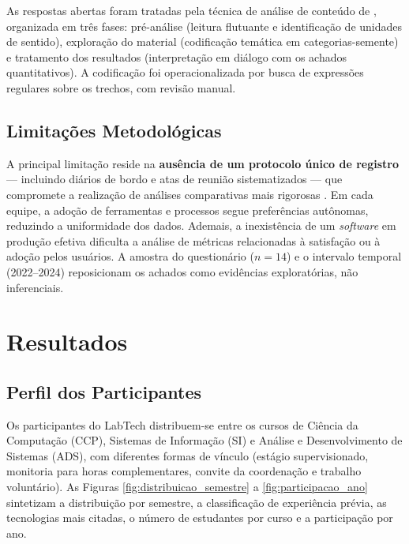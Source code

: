 \documentclass[12pt,a4paper]{article}
\begin{document}
As respostas abertas foram tratadas pela t\'ecnica de an\'alise de
conte\'udo de , organizada em tr\^es fases:
pr\'e-an\'alise (leitura flutuante e identifica\c{c}\~ao de unidades de
sentido), explora\c{c}\~ao do material (codifica\c{c}\~ao tem\'atica em
categorias-semente) e tratamento dos resultados (interpreta\c{c}\~ao em
di\'alogo com os achados quantitativos). A codifica\c{c}\~ao foi
operacionalizada por busca de express\~oes regulares sobre os trechos,
com revis\~ao manual.

\subsection{Limita\c{c}\~oes Metodol\'ogicas}
\label{sec:limitacoes}

A principal limita\c{c}\~ao reside na \textbf{aus\^encia de um protocolo
\'unico de registro} --- incluindo di\'arios de bordo e atas de reuni\~ao
sistematizados --- que compromete a realiza\c{c}\~ao de an\'alises
comparativas mais rigorosas \cite{mineiro2022pesquisa}. Em cada equipe,
a ado\c{c}\~ao de ferramentas e processos segue prefer\^encias aut\^onomas,
reduzindo a uniformidade dos dados. Ademais, a inexist\^encia de um
\emph{software} em produ\c{c}\~ao efetiva dificulta a an\'alise de
m\'etricas relacionadas \`a satisfa\c{c}\~ao ou \`a ado\c{c}\~ao pelos
usu\'arios. A amostra do question\'ario ($n=14$) e o intervalo
temporal (2022--2024) reposicionam os achados como evid\^encias
explorat\'orias, n\~ao inferenciais.

\section{Resultados}
\label{sec:resultados}

\subsection{Perfil dos Participantes}
\label{sec:perfil}

Os participantes do LabTech distribuem-se entre os cursos de Ci\^encia
da Computa\c{c}\~ao (CCP), Sistemas de Informa\c{c}\~ao (SI) e An\'alise e
Desenvolvimento de Sistemas (ADS), com diferentes formas de v\'inculo
(est\'agio supervisionado, monitoria para horas complementares, convite
da coordena\c{c}\~ao e trabalho volunt\'ario). As Figuras
\ref{fig:distribuicao_semestre} a \ref{fig:participacao_ano} sintetizam
a distribui\c{c}\~ao por semestre, a classifica\c{c}\~ao de experi\^encia
pr\'evia, as tecnologias mais citadas, o n\'umero de estudantes por curso
e a participa\c{c}\~ao por ano.
\end{document}
